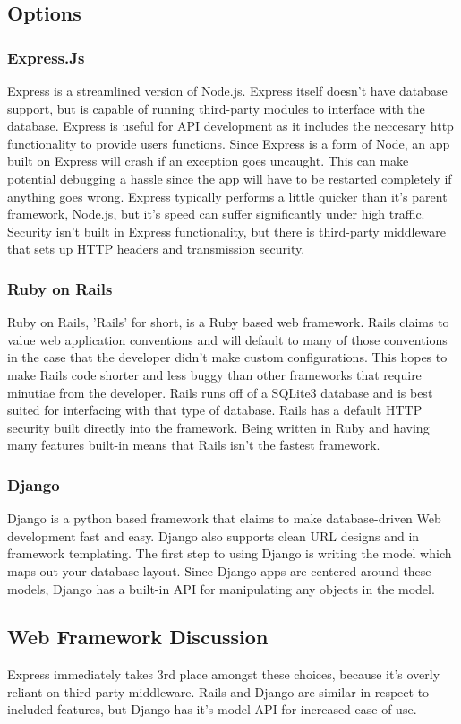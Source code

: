 \documentclass[onecolumn, draftclsnofoot,10pt, compsoc]{IEEEtran}
\begin{document}
\begin{singlespace}
\subsection{Options}
\subsubsection{Express.Js}
Express is a streamlined version of Node.js.
Express itself doesn't have database support, but is capable of running third-party modules to interface with the database.
Express is useful for API development as it includes the neccesary http functionality to provide users functions.
Since Express is a form of Node, an app built on Express will crash if an exception goes uncaught. This can make potential debugging a hassle since the app will have to be restarted completely if anything goes wrong.
Express typically performs a little quicker than it's parent framework, Node.js, but it's speed can suffer significantly under high traffic.
Security isn't built in Express functionality, but there is third-party middleware that sets up HTTP headers and transmission security.
\cite{Express}
\subsubsection{Ruby on Rails}
Ruby on Rails, 'Rails' for short, is a Ruby based web framework.
Rails claims to value web application conventions and will default to many of those conventions in the case that the developer didn't make custom configurations.
This hopes to make Rails code shorter and less buggy than other frameworks that require minutiae from the developer.
Rails runs off of a SQLite3 database and is best suited for interfacing with that type of database.
Rails has a default HTTP security built directly into the framework.
Being written in Ruby and having many features built-in means that Rails isn't the fastest framework.
\cite{Rails}
\subsubsection{Django}
Django is a python based framework that claims to make database-driven Web development fast and easy.
Django also supports clean URL designs and in framework templating.
The first step to using Django is writing the model which maps out your database layout.
\cite{DjangoStart}
Since Django apps are centered around these models, Django has a built-in API for manipulating any objects in the model.
\cite{DjangoOver}
\subsection{Web Framework Discussion}
Express immediately takes 3rd place amongst these choices, because it's overly reliant on third party middleware\cite{Express}. Rails and Django are similar in respect to included features, but Django has it's model API for increased ease of use\cite{Rails}\cite{DjangoOver}. 

\end{singlespace}
\end{document}
